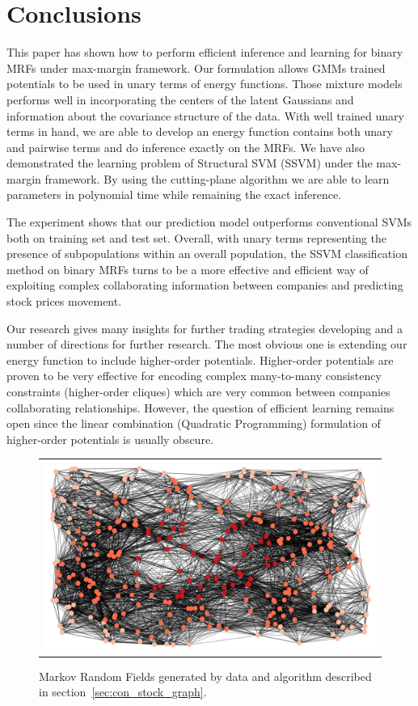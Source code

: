 \section{Conclusions}
\label{sec:conclusion}

This paper has shown how to perform efficient inference and
learning for binary MRFs under max-margin framework. Our
formulation allows GMMs trained potentials to be used in unary
terms of energy functions. Those mixture models performs well in
incorporating the centers of the latent Gaussians and information
about the covariance structure of the data. With well trained
unary terms in hand, we are able to develop an energy function
contains both unary and pairwise terms and do inference exactly
on the MRFs. We have also demonstrated the learning problem of
Structural SVM (SSVM) under the max-margin framework. By using
the cutting-plane algorithm we are able to learn parameters in
polynomial time while remaining the exact inference.

The experiment shows that our prediction model outperforms
conventional SVMs both on training set and test set. Overall,
with unary terms representing the presence of subpopulations
within an overall population, the SSVM classification method on
binary MRFs turns to be a more effective and efficient way of
exploiting complex collaborating information between companies
and predicting stock prices movement.

Our research gives many insights for further trading strategies
developing and a number of directions for further research. The
most obvious one is extending our energy function to include
higher-order potentials. Higher-order potentials are proven to be
very effective for encoding complex many-to-many consistency
constraints (higher-order cliques) which are very common between
companies collaborating relationships. However, the question of
efficient learning remains open since the linear combination
(Quadratic Programming) formulation of higher-order potentials is
usually obscure.



\begin{figure}[th]
  \centering
  \setlength{\tabcolsep}{2pt}
  \begin{tabular}{c}
    \includegraphics[width=0.7\linewidth]{Experiments/figures/network_image.png}
  \end{tabular}
  \caption{\label{fig:synthetic_weights} Markov Random Fields
    generated by data and algorithm described in section~\ref{sec:con_stock_graph}.}
\end{figure}




